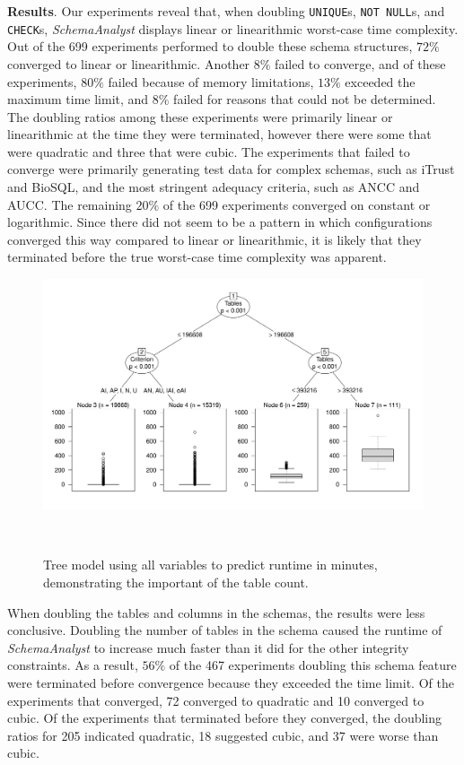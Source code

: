 
\textbf{Results}. Our experiments reveal that, when doubling \texttt{UNIQUE}s, {\tt NOT NULL}s, and {\tt CHECK}s,
\textit{SchemaAnalyst} displays linear or linearithmic worst-case time complexity.  Out of the 699 experiments performed
to double these schema structures, $72\%$ converged to linear or linearithmic.  Another $8\%$ failed to converge, and of
these experiments, $80\%$ failed because of memory limitations, $13\%$ exceeded the maximum time limit, and $8\%$ failed
for reasons that could not be determined.  The doubling ratios among these experiments were primarily linear or
linearithmic at the time they were terminated, however there were some that were quadratic and three that were cubic.
The experiments that failed to converge were primarily generating test data for complex schemas, such as iTrust and
BioSQL, and the most stringent adequacy criteria, such as ANCC and AUCC. The remaining $20\%$ of the 699 experiments
converged on constant or logarithmic.  Since there did not seem to be a pattern in which configurations converged this
way compared to linear or linearithmic, it is likely that they terminated before the true worst-case time complexity was
apparent.

\begin{figure}[t]
\centering
  \centering
  \includegraphics[width=1.025\linewidth]{diagrams/AllTree.pdf}
  \vspace*{-.25in}
  \caption{Tree model using all variables to predict runtime in minutes, demonstrating the important of the table count.
  \vspace{-.315in}}~\label{fig:atree}
\end{figure}

When doubling the tables and columns in the schemas, the results were less conclusive. Doubling the number of tables in
the schema caused the runtime of \textit{SchemaAnalyst} to increase much faster than it did for the other integrity constraints. As
a result, $56\%$ of the 467 experiments doubling this schema feature were terminated before convergence because they
exceeded the time limit.  Of the experiments that converged, 72 converged to quadratic and 10 converged to
cubic.  Of the experiments that terminated before they converged, the doubling ratios for 205 indicated quadratic, 18
suggested cubic, and 37 were worse than cubic.

